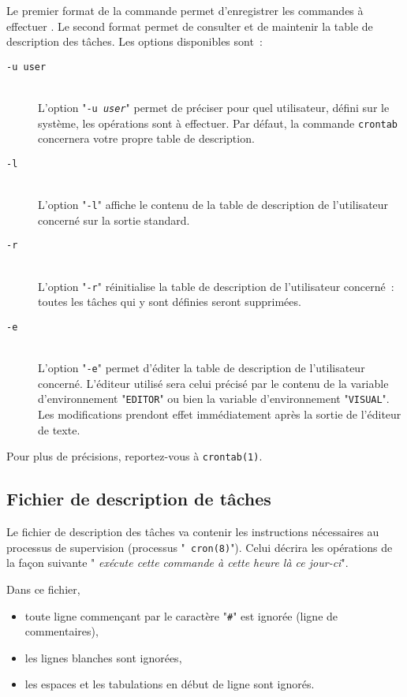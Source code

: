 Le premier format de la commande permet d'enregistrer les commandes {\`a} effectuer .
Le second format permet de consulter et de maintenir la table de description des
t{\^a}ches.
Les options disponibles sont~:
\begin{description}
	\item[{\tt -u user}]\mbox{}\\
		L'option "{\tt -u {\sl user}}" permet de pr{\'e}ciser pour  quel utilisateur, d{\'e}fini
		sur le syst{\`e}me, les op{\'e}rations sont {\`a} effectuer. Par d{\'e}faut, la commande
		{\tt crontab} concernera votre propre table de description.
		
	\item[{\tt -l}]\mbox{}\\
		L'option "{\tt -l}" affiche le contenu de la table de description de
		l'utilisateur concern{\'e} sur la sortie standard.
		
	\item[{\tt -r}]\mbox{}\\
		L'option "{\tt -r}" r{\'e}initialise la table de description de l'utilisateur
		concern{\'e}~: toutes les t{\^a}ches qui y sont d{\'e}finies seront supprim{\'e}es.
		
	\item[{\tt -e}]\mbox{}\\
		L'option "{\tt -e}" permet d'{\'e}diter la table de description de l'utilisateur
		concern{\'e}. L'{\'e}diteur utilis{\'e} sera celui pr{\'e}cis{\'e} par le contenu de la variable
		d'environnement "{\tt EDITOR}" ou bien la variable d'environnement
		"{\tt VISUAL}". Les modifications prendont effet imm{\'e}diatement apr{\`e}s la sortie
		de l'{\'e}diteur de texte. 
\end{description}

Pour plus de pr{\'e}cisions, reportez-vous {\`a} {\tt crontab(1)}.

\subsection{Fichier de description de t{\^a}ches}

Le fichier de description des t{\^a}ches va contenir les instructions
n{\'e}cessaires au processus de supervision (processus "{\tt
cron(8)}"). Celui d{\'e}crira les op{\'e}rations de la fa\c{c}on suivante "{\sl
ex{\'e}cute cette commande {\`a} cette heure l{\`a} ce jour-ci}".

Dans ce fichier,
\begin{itemize}
	\item	toute ligne commen\c{c}ant par le caract{\`e}re "\verb=#=" est ignor{\'e}e (ligne
			de commentaires),
	\item	les lignes blanches sont ignor{\'e}es,
	\item	les espaces et les tabulations en d{\'e}but de ligne sont ignor{\'e}s.
\end{itemize}

